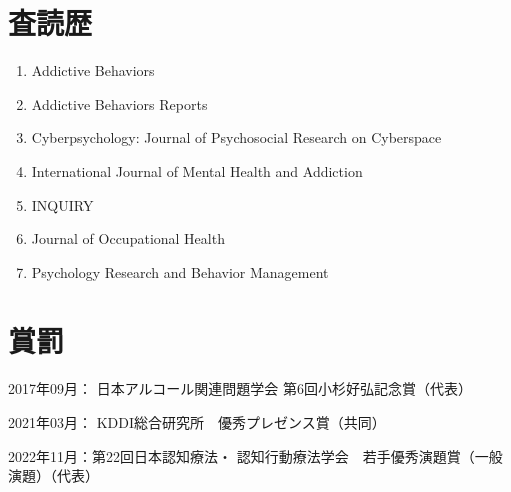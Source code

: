 \documentclass[11pt,a4paper]{article}
\begin{document}
\section{査読歴}
	\begin{enumerate}
	\item Addictive Behaviors
	\item Addictive Behaviors Reports
	\item Cyberpsychology: Journal of Psychosocial Research on Cyberspace 
	\item International Journal of Mental Health and Addiction
	\item INQUIRY
	\item Journal of Occupational Health
	\item Psychology Research and Behavior Management 
\end{enumerate}
\section{賞罰}
\begin{description}
	\item 2017年09月： 日本アルコール関連問題学会 第6回小杉好弘記念賞（代表）
	\item 2021年03月： KDDI総合研究所　優秀プレゼンス賞（共同）
	\item 2022年11月：第22回日本認知療法・	認知行動療法学会　若手優秀演題賞（一般演題）（代表）
\end{description}
\end{document}
